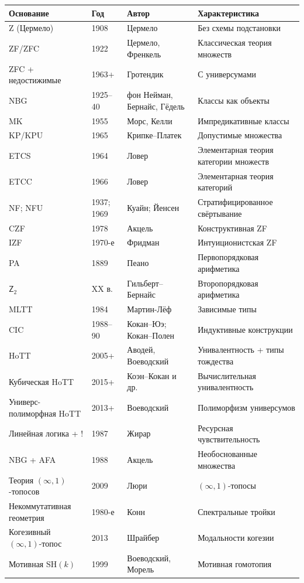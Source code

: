 \documentclass[11pt]{article}
\theoremstyle{plain}
\theoremstyle{definition}
\begin{document}
\begin{longtable}{@{}p{3.8cm}l p{4cm} p{4.6cm}@{}}
\toprule
Основание & Год & Автор & Характеристика \\ \midrule
Z (Цермело) & 1908 & Цермело & Без схемы подстановки \\
ZF/ZFC & 1922 & Цермело, Френкель & Классическая теория множеств \\
ZFC + недостижимые & 1963+ & Гротендик & С универсумами \\
NBG & 1925--40 & фон Нейман, Бернайс, Гёдель & Классы как объекты \\
MK & 1955 & Морс, Келли & Импредикативные классы \\
KP/KPU & 1965 & Крипке--Платек & Допустимые множества \\
ETCS & 1964 & Ловер & Элементарная теория категории множеств \\
ETCC & 1966 & Ловер & Элементарная теория категорий \\
NF; NFU & 1937; 1969 & Куайн; Йенсен & Стратифицированное свёртывание \\
CZF & 1978 & Акцель & Конструктивная ZF \\
IZF & 1970-е & Фридман & Интуиционистская ZF \\
PA & 1889 & Пеано & Первопорядковая арифметика \\
$\mathsf{Z}_2$ & XX в. & Гильберт--Бернайс & Второпорядковая арифметика \\
MLTT & 1984 & Мартин-Лёф & Зависимые типы \\
CIC & 1988--90 & Кокан--Юэ; Кокан--Полен & Индуктивные конструкции \\
HoTT & 2005+ & Аводей, Воеводский & Унивалентность + типы тождества \\
Кубическая HoTT & 2015+ & Коэн--Кокан и др. & Вычислительная унивалентность \\
Универс-полиморфная HoTT & 2013+ & Воеводский & Полиморфизм универсумов \\
Линейная логика + ! & 1987 & Жирар & Ресурсная чувствительность \\
NBG + AFA & 1988 & Акцель & Необоснованные множества \\
Теория $(\infty, 1)$-топосов & 2009 & Люри & $(\infty, 1)$-топосы \\
Некоммутативная геометрия & 1980-е & Конн & Спектральные тройки \\
Когезивный $(\infty, 1)$-топос & 2013 & Шрайбер & Модальности когезии \\
Мотивная $\mathrm{SH}(k)$ & 1999 & Воеводский, Морель & Мотивная гомотопия \\

\end{longtable}
\end{document}
